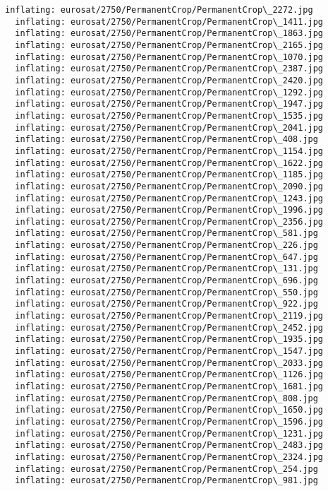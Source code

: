 \documentclass[11pt]{article}
\begin{document}
\begin{Verbatim}[commandchars=\\\{\}]
  inflating: eurosat/2750/PermanentCrop/PermanentCrop\_2272.jpg
  inflating: eurosat/2750/PermanentCrop/PermanentCrop\_1411.jpg
  inflating: eurosat/2750/PermanentCrop/PermanentCrop\_1863.jpg
  inflating: eurosat/2750/PermanentCrop/PermanentCrop\_2165.jpg
  inflating: eurosat/2750/PermanentCrop/PermanentCrop\_1070.jpg
  inflating: eurosat/2750/PermanentCrop/PermanentCrop\_2387.jpg
  inflating: eurosat/2750/PermanentCrop/PermanentCrop\_2420.jpg
  inflating: eurosat/2750/PermanentCrop/PermanentCrop\_1292.jpg
  inflating: eurosat/2750/PermanentCrop/PermanentCrop\_1947.jpg
  inflating: eurosat/2750/PermanentCrop/PermanentCrop\_1535.jpg
  inflating: eurosat/2750/PermanentCrop/PermanentCrop\_2041.jpg
  inflating: eurosat/2750/PermanentCrop/PermanentCrop\_408.jpg
  inflating: eurosat/2750/PermanentCrop/PermanentCrop\_1154.jpg
  inflating: eurosat/2750/PermanentCrop/PermanentCrop\_1622.jpg
  inflating: eurosat/2750/PermanentCrop/PermanentCrop\_1185.jpg
  inflating: eurosat/2750/PermanentCrop/PermanentCrop\_2090.jpg
  inflating: eurosat/2750/PermanentCrop/PermanentCrop\_1243.jpg
  inflating: eurosat/2750/PermanentCrop/PermanentCrop\_1996.jpg
  inflating: eurosat/2750/PermanentCrop/PermanentCrop\_2356.jpg
  inflating: eurosat/2750/PermanentCrop/PermanentCrop\_581.jpg
  inflating: eurosat/2750/PermanentCrop/PermanentCrop\_226.jpg
  inflating: eurosat/2750/PermanentCrop/PermanentCrop\_647.jpg
  inflating: eurosat/2750/PermanentCrop/PermanentCrop\_131.jpg
  inflating: eurosat/2750/PermanentCrop/PermanentCrop\_696.jpg
  inflating: eurosat/2750/PermanentCrop/PermanentCrop\_550.jpg
  inflating: eurosat/2750/PermanentCrop/PermanentCrop\_922.jpg
  inflating: eurosat/2750/PermanentCrop/PermanentCrop\_2119.jpg
  inflating: eurosat/2750/PermanentCrop/PermanentCrop\_2452.jpg
  inflating: eurosat/2750/PermanentCrop/PermanentCrop\_1935.jpg
  inflating: eurosat/2750/PermanentCrop/PermanentCrop\_1547.jpg
  inflating: eurosat/2750/PermanentCrop/PermanentCrop\_2033.jpg
  inflating: eurosat/2750/PermanentCrop/PermanentCrop\_1126.jpg
  inflating: eurosat/2750/PermanentCrop/PermanentCrop\_1681.jpg
  inflating: eurosat/2750/PermanentCrop/PermanentCrop\_808.jpg
  inflating: eurosat/2750/PermanentCrop/PermanentCrop\_1650.jpg
  inflating: eurosat/2750/PermanentCrop/PermanentCrop\_1596.jpg
  inflating: eurosat/2750/PermanentCrop/PermanentCrop\_1231.jpg
  inflating: eurosat/2750/PermanentCrop/PermanentCrop\_2483.jpg
  inflating: eurosat/2750/PermanentCrop/PermanentCrop\_2324.jpg
  inflating: eurosat/2750/PermanentCrop/PermanentCrop\_254.jpg
  inflating: eurosat/2750/PermanentCrop/PermanentCrop\_981.jpg

\end{Verbatim}
\end{document}
